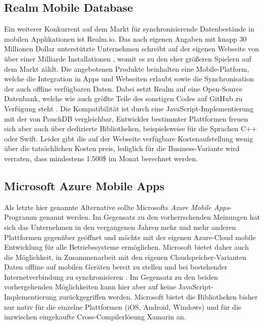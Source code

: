\subsection{Realm Mobile Database}
Ein weiterer Konkurrent auf dem Markt für synchronisierende Datenbestände in mobilen Applikationen ist Realm.io. Das nach eigenen Angaben mit knapp 30 Millionen Dollar unterstützte Unternehmen schreibt auf der eigenen Webseite von über einer Milliarde Installationen \cite{realm:about}, womit es zu den eher größeren Spielern auf dem Markt zählt. Die angebotenen Produkte beinhalten eine Mobile-Platform, welche die Integration in Apps und Webseiten erlaubt sowie die Synchronisation der auch offline verfügbaren Daten. Dabei setzt Realm auf eine Open-Source Datenbank, welche wie auch größte Teile des sonstigen Codes auf GitHub zu Verfügung steht \cite{realm:githubrepo}. Die Kompatibilität ist durch eine JavaScript-Implementierung mit der von PouchDB vergleichbar, Entwickler bestimmter Plattformen freuen sich aber auch über dedizierte Bibliotheken, beispielsweise für die Sprachen C++ oder Swift. Leider gibt die auf der Webseite verfügbare Kostenaufstellung wenig über die tatsächlichen Kosten preis, lediglich für die Business-Variante wird verraten, dass mindestens 1.500\$ im Monat berechnet werden.

\subsection{Microsoft Azure Mobile Apps}
Als letzte hier genannte Alternative sollte Microsofts \emph{Azure Mobile Apps}-Programm genannt werden. Im Gegensatz zu den vorherrschenden Meinungen hat sich das Unternehmen in den vergangenen Jahren mehr und mehr anderen Plattformen gegenüber geöffnet und möchte mit der eigenen Azure-Cloud mobile Entwicklung für alle Betriebssysteme ermöglichen.
Microsoft bietet daher auch die Möglichkeit, in Zusammenarbeit mit den eigenen Cloudspeicher-Varianten Daten offline auf mobilen Geräten bereit zu stellen und bei bestehender Internetverbindung zu synchronisieren \cite{microsoft:azuremobileappssync}. Im Gegensatz zu den beiden vorhergehenden Möglichkeiten kann hier aber auf keine JavaScript-Implementierung zurückgegriffen werden. Microsoft bietet die Bibliotheken bisher nur nativ für die einzelne Plattformen (iOS, Android, Windows) und für die inzwischen eingekaufte Cross-Compilerlösung Xamarin an.
